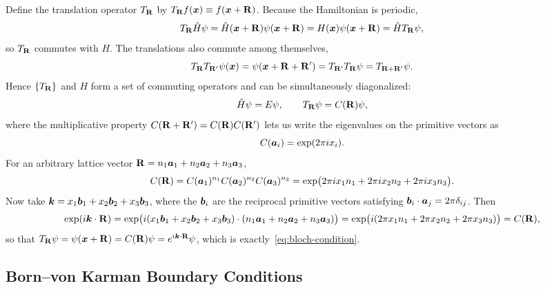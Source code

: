 Define the translation operator $T_{\cvect{R}}$ by $T_{\cvect{R}} f(\lvect{x}) \equiv f(\lvect{x}+\cvect{R})$. Because the Hamiltonian is periodic,
\begin{equation}
    T_{\cvect{R}} \hat{H} \psi = \hat{H}(\lvect{x}+\cvect{R})\psi(\lvect{x}+\cvect{R}) = H(\lvect{x})\psi(\lvect{x}+\cvect{R}) = \hat{H} T_{\cvect{R}}\psi,
\end{equation}
so $T_{\cvect{R}}$ commutes with $H$. The translations also commute among themselves,
\begin{equation}
    T_{\cvect{R}} T_{\cvect{R}'} \psi(\lvect{x}) = \psi(\lvect{x}+\cvect{R}+\cvect{R}') = T_{\cvect{R}'} T_{\cvect{R}} \psi = T_{\cvect{R}+\cvect{R}'}\psi.
\end{equation}
Hence $\{T_{\cvect{R}}\}$ and $H$ form a set of commuting operators and can be simultaneously diagonalized:
\begin{equation}
    \hat{H}\psi = E\psi, \qquad T_{\cvect{R}}\psi = C(\cvect{R})\psi,
\end{equation}
where the multiplicative property $C(\cvect{R}+\cvect{R}') = C(\cvect{R})C(\cvect{R}')$ lets us write the eigenvalues on the primitive vectors as
\begin{equation}
    C(\bm{a}_i) = \exp(2\pi i x_i).
\end{equation}
For an arbitrary lattice vector $\cvect{R} = n_1\lvect{a}_1 + n_2\lvect{a}_2 + n_3\lvect{a}_3$,
\begin{equation}
    C(\cvect{R}) = C(\lvect{a}_1)^{n_1} C(\lvect{a}_2)^{n_2} C(\lvect{a}_3)^{n_3}
    = \exp\bigl(2\pi i x_1 n_1 + 2\pi i x_2 n_2 + 2\pi i x_3 n_3\bigr).
\end{equation}
Now take $\bm{k} = x_1\bm{b}_1 + x_2\bm{b}_2 + x_3\bm{b}_3$, where the $\bm{b}_i$ are the reciprocal primitive vectors satisfying $\bm{b}_i\cdot\bm{a}_j = 2\pi\delta_{ij}$. Then
\begin{equation}
    \exp(i\lvect{k}\cdot\cvect{R}) = \exp\bigl(i(x_1\lvect{b}_1 + x_2\lvect{b}_2 + x_3\lvect{b}_3)\cdot(n_1\lvect{a}_1 + n_2\lvect{a}_2 + n_3\lvect{a}_3)\bigr)
    = \exp\bigl(i(2\pi x_1 n_1 + 2\pi x_2 n_2 + 2\pi x_3 n_3)\bigr) = C(\cvect{R}),
\end{equation}
so that $T_{\cvect{R}}\psi = \psi(\lvect{x}+\cvect{R}) = C(\cvect{R})\psi = e^{i\lvect{k}\cdot\cvect{R}}\psi$, which is exactly~\eqref{eq:bloch-condition}.

\subsection{Born--von Karman Boundary Conditions}

